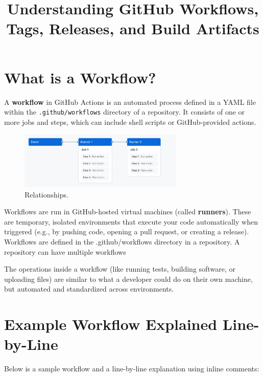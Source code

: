 \documentclass{article}
\title{Understanding GitHub Workflows, Tags, Releases, and Build Artifacts}
\author{}
\date{}
\begin{document}
\maketitle

\section{What is a Workflow?}
A \textbf{workflow} in GitHub Actions is an automated process defined in a YAML file within the \texttt{.github/workflows} directory of a repository. It consists of one or more jobs and steps, which can include shell scripts or GitHub-provided actions.

\begin{figure}[h]
  \centering
  \includegraphics[width=0.7\textwidth]{1.png}
  \caption{Relationships.}
\end{figure}

Workflows are run in GitHub-hosted virtual machines (called \textbf{runners}). These are temporary, isolated environments that execute your code automatically when triggered (e.g., by pushing code, opening a pull request, or creating a release). Workflows are defined in the .github/workflows directory in a repository. A repository can have multiple workflows

The operations inside a workflow (like running tests, building software, or uploading files) are similar to what a developer could do on their own machine, but automated and standardized across environments.

\section{Example Workflow Explained Line-by-Line}
Below is a sample workflow and a line-by-line explanation using inline comments:
\end{document}
